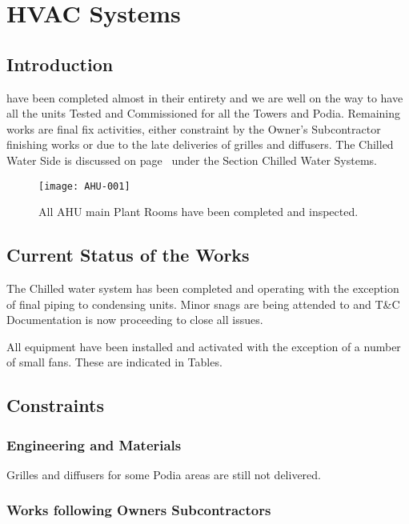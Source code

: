 \chapter{HVAC Systems}
\section{Introduction}
\label{HVAC}

 have been completed almost in their entirety and we are well
on the way to have all the units Tested and Commissioned for all the Towers and Podia. Remaining
works are final fix activities, either constraint by the Owner's Subcontractor finishing works or
due to the late deliveries of grilles and diffusers. The Chilled
Water Side is discussed on page~\pageref{chilledwater} under the Section Chilled Water Systems.

\begin{figure*}%
  \texttt{[image: AHU-001]}
  \caption{All AHU main Plant Rooms have been completed and inspected.}
  \label{fig:marginfig1}
\end{figure*}

\section{Current Status of the Works}

The Chilled water system has been completed and operating with the exception of final piping to
condensing units. Minor snags are being attended to and T\&C Documentation is now proceeding  to close all issues.

All equipment have been installed and activated with the exception of a number of small fans. These are indicated in Tables.

\section{Constraints}
\subsection{Engineering and Materials}

Grilles and diffusers for some Podia areas are still not delivered. 

\subsection{Works following Owners Subcontractors}

